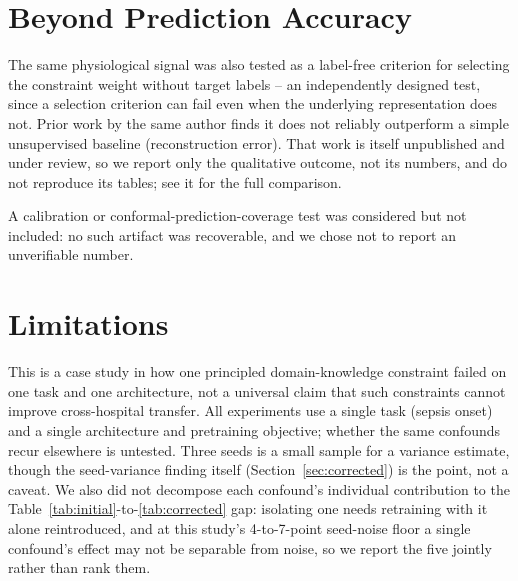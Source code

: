 \documentclass[pmlr,twocolumn,10pt]{jmlr} %
\begin{document}
\section{Beyond Prediction Accuracy}
\label{sec:beyond}

The same physiological signal was also tested as a label-free criterion for
selecting the constraint weight without target labels -- an independently
designed test, since a selection criterion can fail even when the
underlying representation does not. Prior work by the same author
\citep{tamvada2026urtc} finds it does not reliably outperform a simple
unsupervised baseline (reconstruction error). That work is itself
unpublished and under review, so we report only the qualitative outcome,
not its numbers, and do not reproduce its tables; see it for the full
comparison.

A calibration or conformal-prediction-coverage test was considered but not
included: no such artifact was recoverable, and we chose not to report an
unverifiable number.

\section{Limitations}
\label{sec:limitations}

This is a case study in how one principled domain-knowledge constraint
failed on one task and one architecture, not a universal claim that such
constraints cannot improve cross-hospital transfer. All experiments use a
single task (sepsis onset) and a single architecture and pretraining
objective; whether the same confounds recur elsewhere is untested. Three
seeds is a small sample for a variance estimate, though the seed-variance
finding itself (Section~\ref{sec:corrected}) is the point, not a caveat.
We also did not decompose each confound's individual contribution to the
Table~\ref{tab:initial}-to-\ref{tab:corrected} gap: isolating one needs
retraining with it alone reintroduced, and at this study's 4-to-7-point
seed-noise floor a single confound's effect may not be separable from
noise, so we report the five jointly rather than rank them.
\end{document}
